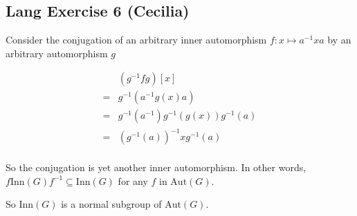 \subsection*{Lang Exercise 6 (Cecilia)}

Consider the conjugation of an arbitrary inner automorphism $ f: x \mapsto a^{-1}xa $ by an arbitrary automorphism $g$

\begin{align*}
   & (g^{-1} f g) [x]       \\
  =& g^{-1} (a^{-1} g(x) a) \\
  =& g^{-1} (a^{-1}) g^{-1}(g(x)) g^{-1}(a) \\
  =& (g^{-1}(a))^{-1} x g^{-1}(a) \\
\end{align*}

So the conjugation is yet another inner automorphism. In other words, $ f \text{Inn}(G) f^{-1} \subseteq \text{Inn}(G) $ for any $ f $ in $ \text{Aut}(G) $.

So $ \text{Inn}(G) $ is a normal subgroup of $ \text{Aut}(G) $.